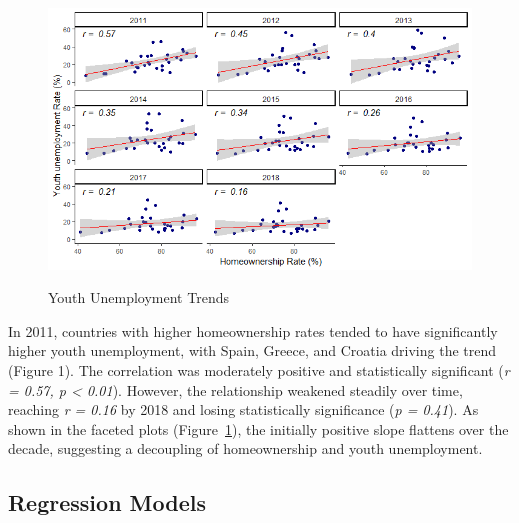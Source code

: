 \documentclass[11pt]{article}
\begin{document}
\begin{multicols}{2}
		\vspace{-1em}
		
		\begin{figure}[H]
			\centering
			\caption{Youth Unemployment Trends}
			\includegraphics[width=1\linewidth]{youth_unemployment_trends.png}
			\label{fig:youth_unemployment_trends}
		\end{figure}

		\vspace{-1em}
		
		In 2011, countries with higher homeownership rates tended to have significantly higher youth unemployment, with Spain, Greece, and Croatia driving the trend (Figure 1). The correlation was moderately positive and statistically significant (\textit{r = 0.57, p < 0.01}). However, the relationship weakened steadily over time, reaching \textit{r = 0.16} by 2018 and losing statistically significance  (\textit{p = 0.41}). As shown in the faceted plots (Figure~\ref{fig:youth_unemployment_trends}), the initially positive slope flattens over the decade, suggesting a decoupling of homeownership and youth unemployment.
		
		\subsection*{Regression Models}


\end{multicols}
\end{document}

